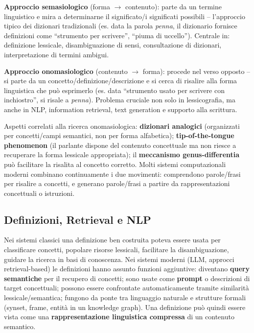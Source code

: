 \documentclass[12pt,a4paper]{article}
\begin{document}
\begin{defbox}
\textbf{Approccio semasiologico} (forma $\to$ contenuto): parte da un termine linguistico e mira a determinarne il significato/i significati possibili -- l'approccio tipico dei dizionari tradizionali (es. data la parola \textit{penna}, il dizionario fornisce definizioni come ``strumento per scrivere'', ``piuma di uccello''). Centrale in: definizione lessicale, disambiguazione di sensi, consultazione di dizionari, interpretazione di termini ambigui.

\textbf{Approccio onomasiologico} (contenuto $\to$ forma): procede nel verso opposto -- si parte da un concetto/definizione/descrizione e si cerca di risalire alla forma linguistica che pu\`o esprimerlo (es. data ``strumento usato per scrivere con inchiostro'', si risale a \textit{penna}). Problema cruciale non solo in lessicografia, ma anche in NLP, information retrieval, text generation e supporto alla scrittura.
\end{defbox}

Aspetti correlati alla ricerca onomasiologica: \textbf{dizionari analogici} (organizzati per concetti/campi semantici, non per forma alfabetica); \textbf{tip-of-the-tongue phenomenon} (il parlante dispone del contenuto concettuale ma non riesce a recuperare la forma lessicale appropriata); il \textbf{meccanismo genus-differentia} pu\`o facilitare la risalita al concetto corretto. Molti sistemi computazionali moderni combinano continuamente i due movimenti: comprendono parole/frasi per risalire a concetti, e generano parole/frasi a partire da rappresentazioni concettuali o istruzioni.

\subsection{Definizioni, Retrieval e NLP}

Nei sistemi classici una definizione ben costruita poteva essere usata per classificare concetti, popolare risorse lessicali, facilitare la disambiguazione, guidare la ricerca in basi di conoscenza. Nei sistemi moderni (LLM, approcci retrieval-based) le definizioni hanno assunto funzioni aggiuntive: diventano \textbf{query semantiche} per il recupero di concetti; sono usate come \textbf{prompt} o descrizioni di target concettuali; possono essere confrontate automaticamente tramite similarit\`a lessicale/semantica; fungono da ponte tra linguaggio naturale e strutture formali (synset, frame, entit\`a in un knowledge graph). Una definizione pu\`o quindi essere vista come una \textbf{rappresentazione linguistica compressa} di un contenuto semantico.
\end{document}
